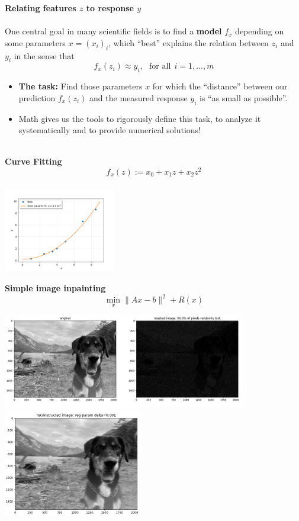 %
\begin{frame}[c]
	\textbf{\large  Relating features $z$ to response $y$}~\\~\\
	One central goal in many scientific fields is to find a \textbf{model} $f_x$ depending on some parameters $x=(x_i)_i$, which ``best'' explains the relation between $z_i$ and $y_i$ in the sense that 
	$$f_x(z_i) \approx y_i,~~~\text{for all}~~i=1,\ldots,m$$
	\begin{itemize}
		\item  \textbf{The task:} Find those parameters $x$ for which the ``distance'' between our prediction  $f_x(z_i)$ and the measured response $y_i$ is ``as small as possible''.\\
		\item Math gives us the tools to rigorously define this task, to analyze it systematically and to provide numerical solutions!
		~\\
	\end{itemize}
~\\
	\textbf{Curve Fitting}
		$$f_x(z) := x_0 + x_1z + x_2 z^2$$
		\\ \centering
		\includegraphics[width=0.37\textwidth]{media/4_least_squares.png}\\
\end{frame}

\begin{frame}[c]
	\textbf{Simple image inpainting}
	\vspace*{-0.3cm}
	$$\min_x \|Ax-b\|^2 + R(x)$$
	\begin{center}
		\includegraphics[width=0.8\textwidth]{media/Image_Inpainting-1.png}\\
		\vspace*{-0.3cm}
		\includegraphics[width=0.45\textwidth]{media/Image_Inpainting-2.png}	
	\end{center}
\end{frame}

